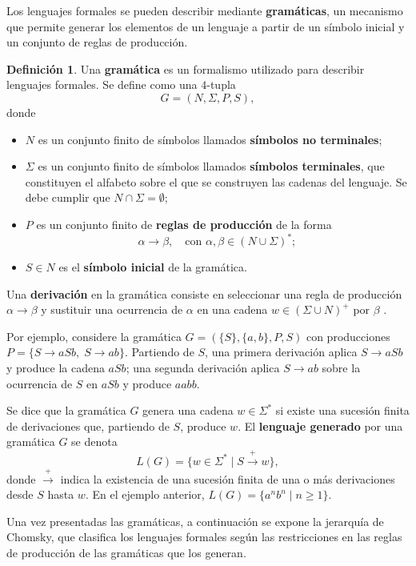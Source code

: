 \documentclass{report}
\theoremstyle{definition}
\newtheorem{definicion}{Definición}[chapter]
\theoremstyle{plain}
\theoremstyle{remark}
\begin{document}
Los lenguajes formales se pueden describir mediante \textbf{gramáticas},
un mecanismo que permite generar los elementos de un lenguaje a partir
de un símbolo inicial y un conjunto de reglas de producción.

\begin{definicion}
Una \textbf{gramática} es un formalismo utilizado para describir
lenguajes formales. Se define como una $4$-tupla
\[
  G = (N, \Sigma, P, S),
\]
donde
\begin{itemize}
  \item $N$ es un conjunto finito de símbolos llamados
    \textbf{símbolos no terminales};
  \item $\Sigma$ es un conjunto finito de símbolos llamados
    \textbf{símbolos terminales}, que constituyen el alfabeto sobre el
    que se construyen las cadenas del lenguaje. Se debe cumplir que
    $N \cap \Sigma = \emptyset$;
  \item $P$ es un conjunto finito de \textbf{reglas de producción} de la
    forma
    \[
      \alpha \to \beta,
      \quad \text{con } \alpha, \beta \in (N \cup \Sigma)^*;
    \]
  \item $S \in N$ es el \textbf{símbolo inicial} de la gramática.
\end{itemize}
\end{definicion}

Una \textbf{derivación} en la gramática consiste en seleccionar una
regla de producción $\alpha \to \beta$ y sustituir una ocurrencia de
$\alpha$ en una cadena $w \in (\Sigma \cup N)^+$ por $\beta$
\cite{hopcroft2006introduction}.

Por ejemplo, considere la gramática $G = (\{S\}, \{a, b\}, P, S)$ con
producciones $P = \{S \to aSb,\; S \to ab\}$. Partiendo de $S$, una
primera derivación aplica $S \to aSb$ y produce la cadena $aSb$; una
segunda derivación aplica $S \to ab$ sobre la ocurrencia de $S$ en
$aSb$ y produce $aabb$.

Se dice que la gramática $G$ genera una cadena $w \in \Sigma^*$ si
existe una sucesión finita de derivaciones que, partiendo de $S$,
produce $w$. El \textbf{lenguaje generado} por una gramática $G$ se
denota
\[
  L(G) = \{ w \in \Sigma^* \mid S \xrightarrow{+} w \},
\]
donde $\xrightarrow{+}$ indica la existencia de una sucesión finita
de una o más derivaciones desde $S$ hasta $w$. En el ejemplo anterior,
$L(G) = \{a^n b^n \mid n \ge 1\}$.

Una vez presentadas las gramáticas, a continuación se expone la
jerarquía de Chomsky, que clasifica los lenguajes formales según las
restricciones en las reglas de producción de las gramáticas que los
generan.
\end{document}
